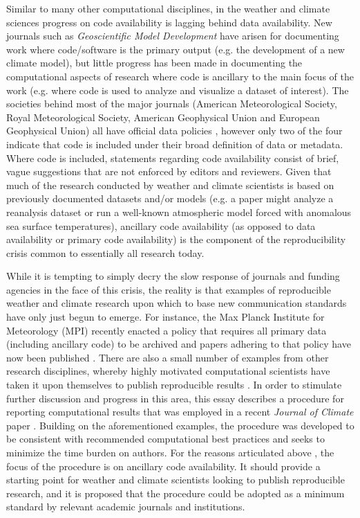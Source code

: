Similar to many other computational disciplines, in the weather and climate sciences progress on code availability is lagging behind data availability. New journals such as \textit{Geoscientific Model Development} have arisen for documenting work where code/software is the primary output (e.g. the development of a new climate model), but little progress has been made in documenting the computational aspects of research where code is ancillary to the main focus of the work (e.g. where code is used to analyze and visualize a dataset of interest). The societies behind most of the major journals (American Meteorological Society, Royal Meteorological Society, American Geophysical Union and European Geophysical Union) all have official data policies \citep[e.g.][]{Mayernik2015}, however only two of the four indicate that code is included under their broad definition of data or metadata. Where code is included, statements regarding code availability consist of brief, vague suggestions that are not enforced by editors and reviewers. Given that much of the research conducted by weather and climate scientists is based on previously documented datasets and/or models (e.g. a paper might analyze a reanalysis dataset or run a well-known atmospheric model forced with anomalous sea surface temperatures), ancillary code availability (as opposed to data availability or primary code availability) is the component of the reproducibility crisis common to essentially all research today.

While it is tempting to simply decry the slow response of journals and funding agencies in the face of this crisis, the reality is that examples of reproducible weather and climate research upon which to base new communication standards have only just begun to emerge. For instance, the Max Planck Institute for Meteorology (MPI) recently enacted a policy that requires all primary data (including ancillary code) to be archived \citep{Stevens2015a} and papers adhering to that policy have now been published \citep[e.g.][]{Stevens2015}. There are also a small number of examples from other research disciplines, whereby highly motivated computational scientists have taken it upon themselves to publish reproducible results \citep[e.g.][]{Ketcheson2012,Crooks2014,Schmitt2015}. In order to stimulate further discussion and progress in this area, this essay describes a procedure for reporting computational results that was employed in a recent \textit{Journal of Climate} paper \citep[][hereafter referred to as IS2015]{IrvingSimmonds2015}. Building on the aforementioned examples, the procedure was developed to be consistent with recommended computational best practices and seeks to minimize the time burden on authors. For the reasons articulated above \citep[and the fact that data availability has already been addressed in a recent BAMS essay;][]{Mayernik2015a}, the focus of the procedure is on ancillary code availability. It should provide a starting point for weather and climate scientists looking to publish reproducible research, and it is proposed that the procedure could be adopted as a minimum standard by relevant academic journals and institutions.

  